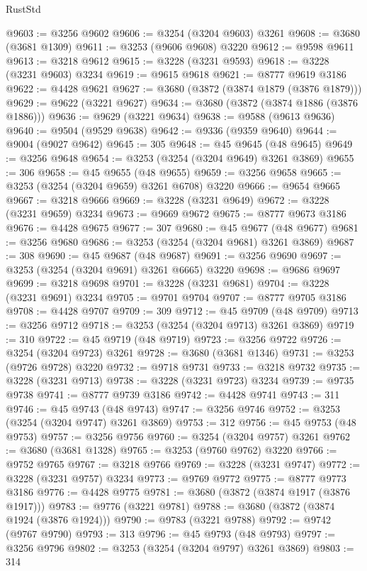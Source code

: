 \begin{lexlean}{RustStd}
\begin{coremodule}
{\begin{coremodule}
{{{{{{{{{{{{{{{{{{{{{{{{{{{{{{{{{{{{{@9603 := @3256 @9602
@9606 := @3254 (@3204 @9603) @3261
@9608 := @3680 (@3681 @1309)
@9611 := @3253 (@9606 @9608) @3220
@9612 := @9598 @9611
@9613 := @3218 @9612
@9615 := @3228 (@3231 @9593)
@9618 := @3228 (@3231 @9603) @3234
@9619 := @9615 @9618
@9621 := @8777 @9619 @3186
@9622 := @4428 @9621
@9627 := @3680 (@3872 (@3874 @1879 (@3876 @1879)))
@9629 := @9622 (@3221 @9627)
@9634 := @3680 (@3872 (@3874 @1886 (@3876 @1886)))
@9636 := @9629 (@3221 @9634)
@9638 := @9588 (@9613 @9636)
@9640 := @9504 (@9529 @9638)
@9642 := @9336 (@9359 @9640)
@9644 := @9004 (@9027 @9642)
@9645 := 305
@9648 := @45 @9645 (@48 @9645)
@9649 := @3256 @9648
@9654 := @3253 (@3254 (@3204 @9649) @3261 @3869)
@9655 := 306
@9658 := @45 @9655 (@48 @9655)
@9659 := @3256 @9658
@9665 := @3253 (@3254 (@3204 @9659) @3261 @6708) @3220
@9666 := @9654 @9665
@9667 := @3218 @9666
@9669 := @3228 (@3231 @9649)
@9672 := @3228 (@3231 @9659) @3234
@9673 := @9669 @9672
@9675 := @8777 @9673 @3186
@9676 := @4428 @9675
@9677 := 307
@9680 := @45 @9677 (@48 @9677)
@9681 := @3256 @9680
@9686 := @3253 (@3254 (@3204 @9681) @3261 @3869)
@9687 := 308
@9690 := @45 @9687 (@48 @9687)
@9691 := @3256 @9690
@9697 := @3253 (@3254 (@3204 @9691) @3261 @6665) @3220
@9698 := @9686 @9697
@9699 := @3218 @9698
@9701 := @3228 (@3231 @9681)
@9704 := @3228 (@3231 @9691) @3234
@9705 := @9701 @9704
@9707 := @8777 @9705 @3186
@9708 := @4428 @9707
@9709 := 309
@9712 := @45 @9709 (@48 @9709)
@9713 := @3256 @9712
@9718 := @3253 (@3254 (@3204 @9713) @3261 @3869)
@9719 := 310
@9722 := @45 @9719 (@48 @9719)
@9723 := @3256 @9722
@9726 := @3254 (@3204 @9723) @3261
@9728 := @3680 (@3681 @1346)
@9731 := @3253 (@9726 @9728) @3220
@9732 := @9718 @9731
@9733 := @3218 @9732
@9735 := @3228 (@3231 @9713)
@9738 := @3228 (@3231 @9723) @3234
@9739 := @9735 @9738
@9741 := @8777 @9739 @3186
@9742 := @4428 @9741
@9743 := 311
@9746 := @45 @9743 (@48 @9743)
@9747 := @3256 @9746
@9752 := @3253 (@3254 (@3204 @9747) @3261 @3869)
@9753 := 312
@9756 := @45 @9753 (@48 @9753)
@9757 := @3256 @9756
@9760 := @3254 (@3204 @9757) @3261
@9762 := @3680 (@3681 @1328)
@9765 := @3253 (@9760 @9762) @3220
@9766 := @9752 @9765
@9767 := @3218 @9766
@9769 := @3228 (@3231 @9747)
@9772 := @3228 (@3231 @9757) @3234
@9773 := @9769 @9772
@9775 := @8777 @9773 @3186
@9776 := @4428 @9775
@9781 := @3680 (@3872 (@3874 @1917 (@3876 @1917)))
@9783 := @9776 (@3221 @9781)
@9788 := @3680 (@3872 (@3874 @1924 (@3876 @1924)))
@9790 := @9783 (@3221 @9788)
@9792 := @9742 (@9767 @9790)
@9793 := 313
@9796 := @45 @9793 (@48 @9793)
@9797 := @3256 @9796
@9802 := @3253 (@3254 (@3204 @9797) @3261 @3869)
@9803 := 314
}}}}}}}}}}}}}}}}}}}}}}}}}}}}}}}}}}}}}
\end{coremodule}}
\end{coremodule}
\end{lexlean}
